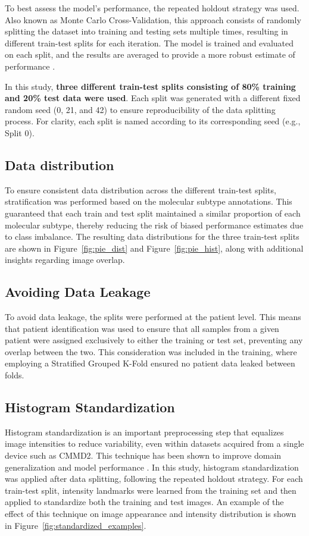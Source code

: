 \documentclass[a4paper,10pt]{book}
\begin{document}
To best assess the model's performance, the repeated holdout strategy was used. Also known as Monte Carlo Cross-Validation, this approach consists of randomly splitting the dataset into training and testing sets multiple times, resulting in different train-test splits for each iteration. The model is trained and evaluated on each split, and the results are averaged to provide a more robust estimate of performance \cite{marzbanAllModelsAre2020}.

In this study, \textbf{three different train-test splits consisting of 80\% training and 20\% test data were used}. Each split was generated with a different fixed random seed (0, 21, and 42) to ensure reproducibility of the data splitting process. For clarity, each split is named according to its corresponding seed (e.g., Split 0).

\subsection{Data distribution}

To ensure consistent data distribution across the different train-test splits, stratification was performed based on the molecular subtype annotations. This guaranteed that each train and test split maintained a similar proportion of each molecular subtype, thereby reducing the risk of biased performance estimates due to class imbalance. The resulting data distributions for the three train-test splits are shown in Figure~\ref{fig:pie_dist} and Figure~\ref{fig:pie_hist}, along with additional insights regarding image overlap.

\subsection{Avoiding Data Leakage}

To avoid data leakage, the splits were performed at the patient level. This means that patient identification was used to ensure that all samples from a given patient were assigned exclusively to either the training or test set, preventing any overlap between the two. This consideration was included in the training, where employing a Stratified Grouped K-Fold ensured no patient data leaked between folds.

\subsection{Histogram Standardization} 

Histogram standardization is an important preprocessing step that equalizes image intensities to reduce variability, even within datasets acquired from a single device such as CMMD2. This technique has been shown to improve domain generalization and model performance \cite{garruchoDomainGeneralizationDeep2022}. In this study, histogram standardization was applied after data splitting, following the repeated holdout strategy. For each train-test split, intensity landmarks were learned from the training set and then applied to standardize both the training and test images. An example of the effect of this technique on image appearance and intensity distribution is shown in Figure~\ref{fig:standardized_examples}.
\end{document}

